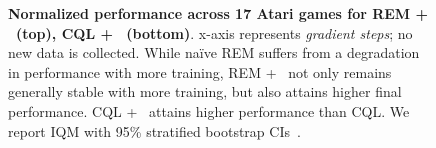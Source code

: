 \begin{figure}[t]
\begin{minipage}{.56\textwidth}
    \vspace{-0.25in}
    \caption{\footnotesize{\textbf{Normalized performance across 17 Atari games for REM + \methodname\ (top), CQL + \methodname\ (bottom)}. x-axis represents \emph{gradient steps}; no new data is collected. While na\"ive REM suffers from a degradation in performance with more training, REM + \methodname\ not only remains generally stable with more training, but also attains higher final performance. CQL + \methodname\ attains higher performance than CQL. We report IQM with  95\% stratified bootstrap CIs~\citep{agarwal2021precipice}}.}
    \label{fig:atari_all_combined}
\end{minipage}
\vspace{-0.5cm}
\end{figure}






